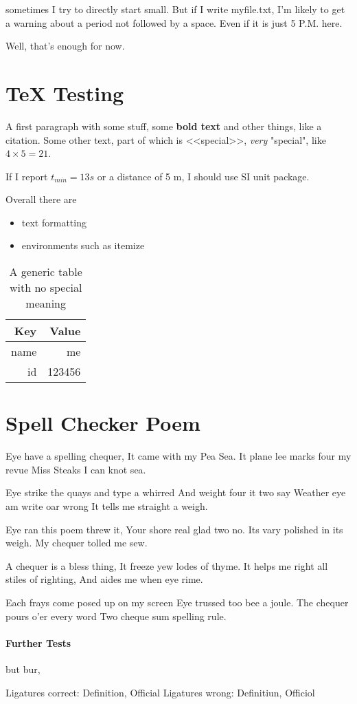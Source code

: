 \documentclass{scrartcl}
\begin{document}
sometimes I try to directly start small. But if I write myfile.txt, I'm likely to get a warning about a period not followed by a space. Even if it is just 5 P.M. here.

Well, that's enough for now.





\section{TeX Testing}\label{sec:texsection}
A first paragraph with some stuff, some \textbf{bold text}   and other things, like a citation\cite{my:paper}.
Some other text, part of which is <<special>>, \emph{very} "special", like $4 \times 5 = 21$.

If I report $t_{min} = 13s$ or a distance of 5 m, I should use SI unit package.


Overall there are 
\begin{itemize}
	\item text formatting
	\item environments such as itemize
\end{itemize}


\begin{table}
	\centering
    \begin{tabular}{@{}rr@{}} 
    \textbf{Key}  & \textbf{Value} \\ \hline
    name & me \\
    id & 123456\\
    \end{tabular}
    \caption{A generic table with no special meaning}
    \label{tab:example}
\end{table}


\section{Spell Checker Poem}
Eye have a spelling chequer,
It came with my Pea Sea.
It plane lee marks four my revue
Miss Steaks I can knot sea.

Eye strike the quays and type a whirred
And weight four it two say
Weather eye am write oar wrong
It tells me straight a weigh.

Eye ran this poem threw it,
Your shore real glad two no.
Its vary polished in its weigh.
My chequer tolled me sew.

A chequer is a bless thing,
It freeze yew lodes of thyme.
It helps me right all stiles of righting,
And aides me when eye rime.

Each frays come posed up on my screen
Eye trussed too bee a joule.
The chequer pours o'er every word
Two cheque sum spelling rule.


\paragraph{Further Tests}
but bur, 

Ligatures correct: Deﬁnition, Oﬀicial
Ligatures wrong: Deﬁnitiun, Oﬀiciol
\end{document}
